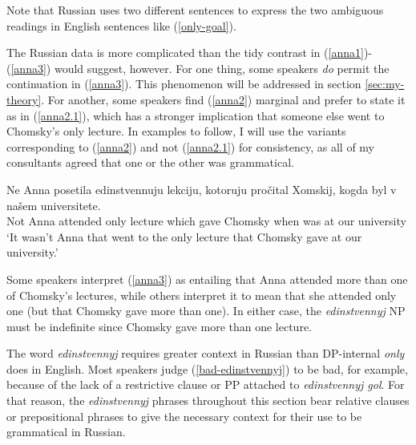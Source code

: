 Note that Russian uses two different sentences to express the two ambiguous readings in English sentences like (\ref{only-goal}).

The Russian data is more complicated than the tidy contrast in (\ref{anna1})-(\ref{anna3}) would suggest, however. For one thing, some speakers \textit{do} permit the continuation in (\ref{anna3}). This phenomenon will be addressed in section \ref{sec:my-theory}. For another, some speakers find (\ref{anna2}) marginal and prefer to state it as in (\ref{anna2.1}), which has a stronger implication that someone else went to Chomsky's only lecture. In examples to follow, I will use the variants corresponding to (\ref{anna2}) and not (\ref{anna2.1}) for consistency, as all of my consultants agreed that one or the other was grammatical.

\begin{exe}
	\ex \label{anna2.1} \gll Ne Anna posetila edinstvennuju lekciju, kotoruju pro\v{c}ital Xomskij, kogda byl v na\v{s}em universitete.\\
	Not Anna attended only lecture which gave Chomsky when was at our university\\
	\glt `It wasn't Anna that went to the only lecture that Chomsky gave at our university.'
\end{exe}

Some speakers interpret (\ref{anna3}) as entailing that Anna attended more than one of Chomsky's lectures, while others interpret it to mean that she attended only one (but that Chomsky gave more than one). In either case, the \textit{edinstvennyj} NP must be indefinite since Chomsky gave more than one lecture.

The word \textit{edinstvennyj} requires greater context in Russian than DP-internal \textit{only} does in English. Most speakers judge (\ref{bad-edinstvennyj}) to be bad, for example, because of the lack of a restrictive clause or PP attached to \textit{edinstvennyj gol}. For that reason, the \textit{edinstvennyj} phrases throughout this section bear relative clauses or prepositional phrases to give the necessary context for their use to be grammatical in Russian.

\begin{exe}
\end{exe}

